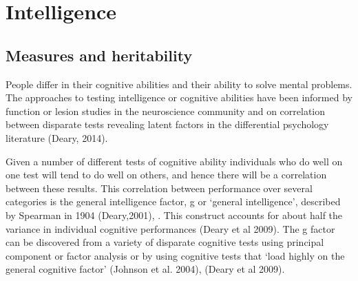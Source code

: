 \section{Intelligence}
\label{sec:Introduction intelligence}
\subsection{Measures and heritability}

People differ in their cognitive abilities and their ability to solve mental problems. The approaches to testing intelligence or cognitive abilities have been informed by function or lesion studies in the neuroscience community and on correlation between disparate tests revealing latent factors in the differential psychology literature \cite{deary2014stability} (Deary, 2014).

Given a number of different tests of cognitive ability individuals who do well on one test will tend to do well on others, and hence there will be a correlation between these results. This correlation between performance over several categories is the general intelligence factor, g or ‘general intelligence’, described by Spearman in 1904  \cite{deary2001intelligence}(Deary,2001), \cite{deary2014stability}. This construct accounts for about half the variance in individual cognitive performances \cite{deary2009genetic}(Deary et al 2009). The g factor can be discovered from a variety of disparate cognitive tests using principal component or factor analysis or by using cognitive tests that ‘load highly on the general cognitive factor’ \cite{johnson2004just}(Johnson et al. 2004), \cite{deary2009genetic} (Deary et al 2009).

